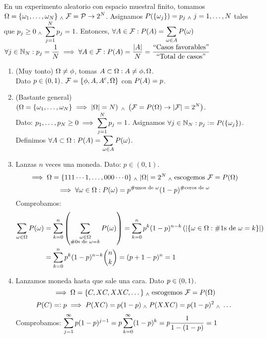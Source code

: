 \begin{ejem}
	En un experimento aleatorio con espacio muestral finito, tomamos \\
	$\displaystyle \Omega = \{\omega_1, \dots, \omega_N\}  \; _{\wedge} \; \mathcal{F} = \mathcal{P} \rightarrow 2^N$. Asignamos $\displaystyle P(\{\omega_j\}) = p_j \; _{\wedge} \; j = 1, \dots, N$ tales que $\displaystyle p_j\geq 0 \; _{\wedge} \; \sum_{j=1}^{N} p_j = 1$. Entonces, $\displaystyle\forall A \in \mathcal{F} : P(A) = \sum_{\omega \in A} P(\omega)$ \\
	$\displaystyle \forall j \in \mathbb{N}_N : p_j = \frac{1}{N} \implies \forall A \in \mathcal{F} : P(A) = \frac{|A|}{N} = \frac{\text{``Casos favorables''}}{\text{``Total de casos''}}$
\end{ejem}
\begin{enumerate}%
	\item (Muy tonto) $\displaystyle\Omega \ne \phi$, tomas $\displaystyle A \subset \Omega : A\ne \phi, \Omega$. \\
	      Dato $\displaystyle p\in (0, 1)$. $\displaystyle\mathcal{F} = \{\phi, A, A^c, \Omega\}$ con $\displaystyle P(A) = p$.
	\item (Bastante general) $\displaystyle\left(\Omega = \{\omega_1, \dots, \omega_N\} \implies |\Omega| = N\right) \; _{\wedge} \; \left(\mathcal{F} = P(\Omega) \rightarrow |\mathcal{F}|=2^N\right)$. \\
	      Dato: $\displaystyle p_1, \dots, p_N \ge 0 \implies \sum_{j=1}^N p_j=1$.
	      Asignamos $\displaystyle \forall j\in \mathbb{N}_N : p_j\vcentcolon= P(\{\omega_j\})$.\\
	      Definimos $\displaystyle \forall A\subset \Omega : P(A) = \sum_{\omega \in A}P(\omega)$.\\
	\item Lanzas $n$ veces una moneda. Dato: $p \in (0,1)$.
	      \[\implies \Omega = \{111\cdots1, \dots, 000\cdots0\} \; _{\wedge} \; |\Omega|=2^N \; _{\wedge} \; \text{escogemos } \mathcal{F}=P(\Omega)\]
	      \[\implies \forall \omega \in \Omega : P(\omega)= p^{\#\text{unos de }\omega} (1-p)^{\#\text{ceros de }\omega}\]
	      Comprobamos:
	      \begin{equation*}
		      \begin{split}
			      \displaystyle\sum_{\omega \in \Omega} P(\omega) & =\sum_{k=0}^n \left(\sum_{\substack{\omega\in \Omega                                         \\
			      \#\text{0s de }\omega = k}} P(\omega)\right)=\sum_{k=0}^n p^k (1-p)^{n-k}\left(|\{\omega\in \Omega :\#\text{1s de } \omega=k\}|\right) \\
			                                            & =\sum_{k=0}^np^k(1-p)^{n-k} \binom{n}{k} = (p+1-p)^n=1
		      \end{split}
	      \end{equation*}
	\item Lanzamos moneda hasta que sale una cara. Dato $\displaystyle p\in (0,1)$.
	      \[\implies \Omega = \{C, XC, XXC, \dots\} \; _{\wedge} \; \text{escogemos } \mathcal{F}=P(\Omega)\]
	      \[P(C)=\vcentcolon p \implies P(XC)=p(1-p) \; _{\wedge} \; P(XXC)=p(1-p)^2 \; _{\wedge} \; \dots\]
	      Comprobamos: $\displaystyle\sum_{j=1}^{\infty} p(1-p)^{j-1} = p\sum_{k=0}^\infty(1-p)^k =
		      p \frac{1}{1-(1-p)} = 1$
\end{enumerate}
